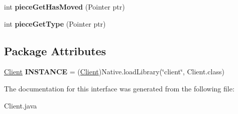 \begin{DoxyCompactItemize}
\item 
\hypertarget{interfaceClient_a285985a9ae48f376629356a8851190d6}{
int {\bfseries pieceGetHasMoved} (Pointer ptr)}
\label{interfaceClient_a285985a9ae48f376629356a8851190d6}

\item 
\hypertarget{interfaceClient_aa3e90d80e50be15fe402ee1cef1ab8d8}{
int {\bfseries pieceGetType} (Pointer ptr)}
\label{interfaceClient_aa3e90d80e50be15fe402ee1cef1ab8d8}

\end{DoxyCompactItemize}
\subsection*{Package Attributes}
\begin{DoxyCompactItemize}
\item 
\hypertarget{interfaceClient_a0ae9e0dc323a16f1240f314e379de21e}{
\hyperlink{interfaceClient}{Client} {\bfseries INSTANCE} = (\hyperlink{interfaceClient}{Client})Native.loadLibrary(\char`\"{}client\char`\"{}, Client.class)}
\label{interfaceClient_a0ae9e0dc323a16f1240f314e379de21e}

\end{DoxyCompactItemize}


The documentation for this interface was generated from the following file:\begin{DoxyCompactItemize}
\item 
Client.java\end{DoxyCompactItemize}
